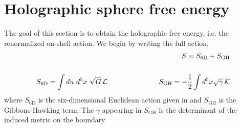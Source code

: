 \documentclass[12pt]{article}
\begin{document}
\section{Holographic sphere free energy}
\setcounter{equation}{0}
The goal of this section is to obtain the holographic free energy, i.e. the renormalized on-shell action. We begin by writing the full action, 
\begin{eqnarray}
\vphantom{.} \hspace{1.7 in} S = S_{\mathrm{6D}} + S_{\mathrm{GH}}
\nonumber\\\nonumber\\
\vphantom{.} S_{\mathrm{6D}} = \int du~d^5 x ~\sqrt{G}\, {\cal L} \hspace{1 in}S_{\mathrm{GH}}=- {1 \over 2} \int d^5 x \sqrt{\gamma}\, {\cal K}
\end{eqnarray}
where $S_{\mathrm{6D}}$ is the six-dimensional Euclidean action given in and $S_{\mathrm{GH}}$ is the Gibbons-Hawking term. The $\gamma$ appearing in $S_{\mathrm{GH}}$ is the determinant of the induced metric on the boundary 
\end{document}
